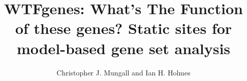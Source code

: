 \documentclass{article}
\begin{document}
\newcommand\structabs[5]{\maketitle \abstract{#1 #2 #3 Contact: #4}}

\title{WTFgenes: What's The Function of these genes? Static sites for model-based gene set analysis}
\author{Christopher J. Mungall and Ian H. Holmes}


\end{document}
